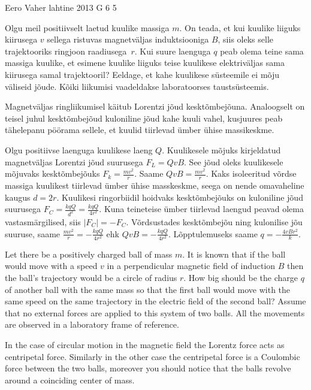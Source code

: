 {Eero Vaher} %
{lahtine} %
{2013} %
{G 6} %
{5} %
{
\ifStatement
Olgu meil positiivselt laetud kuulike massiga $m$. On teada, et kui kuulike
liiguks kiirusega $v$ sellega ristuvas magnetväljas induktsiooniga $B$,
siis oleks selle trajektooriks ringjoon raadiusega~$r$. Kui suure laenguga $q$ peab olema teine sama massiga kuulike, et esimene
kuulike liiguks teise kuulikese elektriväljas sama kiirusega samal trajektooril? Eeldage, et
kahe kuulikese süsteemile ei mõju väliseid jõude. Kõiki liikumisi vaadeldakse
laboratoorses taustsüsteemis.
\pagebreak
\fi


\ifHint
Magnetväljas ringliikumisel käitub Lorentzi jõud kesktõmbejõuna. Analoogselt on teisel juhul kesktõmbejõud kuloniline jõud kahe kuuli vahel, kusjuures peab tähelepanu pöörama sellele, et kuulid tiirlevad ümber ühise massikeskme.
\fi


\ifSolution
Olgu positiivse laenguga kuulikese laeng $Q$. Kuulikesele mõjuks kirjeldatud magnetväljas Lorentzi jõud suurusega $F_L=QvB$. See jõud oleks kuulikesele mõjuvaks kesktõmbejõuks $F_k=\frac{mv^2}{r}$. Saame $QvB=\frac{mv^2}{r}$. Kaks isoleeritud võrdse massiga kuulikest tiirlevad ümber ühise masskeskme, seega on nende omavaheline kaugus $d=2r$. Kuulikesi ringorbiidil hoidvaks kesktõmbejõuks on kuloniline jõud suurusega $F_C=\frac{kqQ}{d^2}=\frac{kqQ}{4r^2}$. Kuna teineteise ümber tiirlevad laengud peavad olema vastasmärgilised, siis $|F_C|=-F_C$. Võrdsustades kesktõmbejõu ning kulonilise jõu suuruse, saame $\frac{mv^2}{r}=-\frac{kqQ}{4r^2}$ ehk $QvB=-\frac{kqQ}{4r^2}$. Lõpptulemuseks saame $q=-\frac{4vBr^2}{k}$.
\fi


\ifEngStatement
Let there be a positively charged ball of mass $m$. It is known that if the ball would move with a speed $v$ in a perpendicular magnetic field of induction $B$ then the ball’s trajectory would be a circle of radius $r$. How big should be the charge $q$ of another ball with the same mass so that the first ball would move with the same speed on the same trajectory in the electric field of the second ball? Assume that no external forces are applied to this system of two balls. All the movements are observed in a laboratory frame of reference.
\fi


\ifEngHint
In the case of circular motion in the magnetic field the Lorentz force acts as centripetal force. Similarly in the other case the centripetal force is a Coulombic force between the two balls, moreover you should notice that the balls revolve around a coinciding center of mass.
\fi


}
